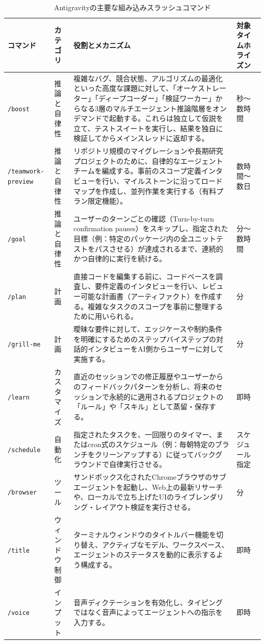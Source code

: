 \documentclass[a4paper,11pt]{ltjsarticle}
\newcommand{\cmd}[1]{\texttt{#1}}
\begin{document}
\begin{table}[htbp]
\centering
\caption{Antigravityの主要な組み込みスラッシュコマンド}
\label{tab:antigravity}
\small
\begin{tabularx}{\textwidth}{P{30mm}P{18mm}LP{18mm}}
\toprule
コマンド & カテゴリ & 役割とメカニズム & 対象タイム\newline ホライズン \\
\midrule
\cmd{/boost} & 推論と自律性 & 複雑なバグ、競合状態、アルゴリズムの最適化といった高度な課題に対して、「オーケストレーター」「ディープコーダー」「検証ワーカー」からなる3層のマルチエージェント推論階層をオンデマンドで起動する。これらは独立して仮説を立て、テストスイートを実行し、結果を独自に検証してからメインスレッドに返却する\cite{r8}。 & 秒〜数時間 \\
\cmd{/teamwork-preview} & 推論と自律性 & リポジトリ規模のマイグレーションや長期研究プロジェクトのために、自律的なエージェントチームを編成する。事前のスコープ定義インタビューを行い、マイルストーンに沿ってロードマップを作成し、並列作業を実行する（有料プラン限定機能）\cite{r8}。 & 数時間〜数日 \\
\cmd{/goal} & 推論と自律性 & ユーザーのターンごとの確認（Turn-by-turn confirmation pauses）をスキップし、指定された目標（例：特定のパッケージ内の全ユニットテストをパスさせる）が達成されるまで、連続的かつ自律的に実行を続ける\cite{r8}。 & 分〜数時間 \\
\cmd{/plan} & 計画 & 直接コードを編集する前に、コードベースを調査し、要件定義のインタビューを行い、レビュー可能な計画書（アーティファクト）を作成する。複雑なタスクのスコープを事前に整理するために用いられる\cite{r8}。 & 分 \\
\cmd{/grill-me} & 計画 & 曖昧な要件に対して、エッジケースや制約条件を明確にするためのステップバイステップの対話的インタビューをAI側からユーザーに対して実施する\cite{r8}。 & 分 \\
\cmd{/learn} & カスタマイズ & 直近のセッションでの修正履歴やユーザーからのフィードバックパターンを分析し、将来のセッションで永続的に適用されるプロジェクトの「ルール」や「スキル」として蒸留・保存する\cite{r8}。 & 即時 \\
\cmd{/schedule} & 自動化 & 指定されたタスクを、一回限りのタイマー、またはcron式のスケジュール（例：毎朝特定のブランチをクリーンアップする）に従ってバックグラウンドで自律実行させる\cite{r8}。 & スケジュール指定 \\
\cmd{/browser} & ツール & サンドボックス化されたChromeブラウザのサブエージェントを起動し、Web上の最新リサーチや、ローカルで立ち上げたUIのライブレンダリング・レイアウト検証を実行させる\cite{r8}。 & 分 \\
\cmd{/title} & ウィンドウ制御 & ターミナルウィンドウのタイトルバー機能を切り替え、アクティブなモデル、ワークスペース、エージェントのステータスを動的に表示するよう構成する\cite{r29}。 & 即時 \\
\cmd{/voice} & インプット & 音声ディクテーションを有効化し、タイピングではなく音声によってエージェントへの指示を入力する\cite{r30}。 & 即時 \\
\bottomrule
\end{tabularx}
\end{table}
\end{document}
